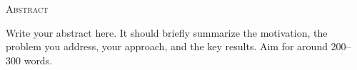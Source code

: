 \begin{center}
  \textsc{Abstract}
\end{center}
%
\noindent
%
Write your abstract here. It should briefly summarize the motivation, the problem you address, your approach, and the key results. Aim for around 200--300 words.
